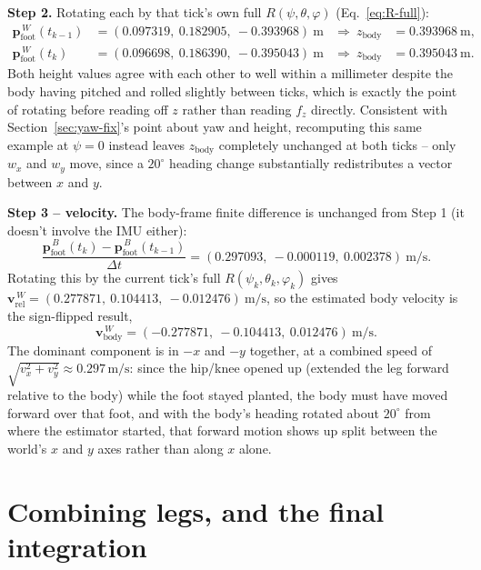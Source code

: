 \documentclass[11pt]{article}
\begin{document}
\noindent \textbf{Step 2.} Rotating each by that tick's own full
$R(\psi,\theta,\varphi)$ (Eq.~\eqref{eq:R-full}):
\begin{align}
\mathbf{p}_{\text{foot}}^{\,W}(t_{k-1}) &= (0.097319,\ 0.182905,\ -0.393968)\ \text{m}
&\Rightarrow\ z_{\text{body}} &= 0.393968\ \text{m}, \\
\mathbf{p}_{\text{foot}}^{\,W}(t_{k})   &= (0.096698,\ 0.186390,\ -0.395043)\ \text{m}
&\Rightarrow\ z_{\text{body}} &= 0.395043\ \text{m}.
\end{align}
Both height values agree with each other to well within a millimeter
despite the body having pitched and rolled slightly between ticks, which is
exactly the point of rotating before reading off $z$ rather than reading
$f_z$ directly. Consistent with Section~\ref{sec:yaw-fix}'s point about
yaw and height, recomputing this same example at $\psi = 0$ instead leaves
$z_{\text{body}}$ completely unchanged at both ticks -- only $w_x$ and
$w_y$ move, since a $20^\circ$ heading change substantially redistributes a
vector between $x$ and $y$.

\noindent \textbf{Step 3 -- velocity.} The body-frame finite difference is
unchanged from Step 1 (it doesn't involve the IMU either):
\begin{equation}
\frac{\mathbf{p}_{\text{foot}}^{\,B}(t_k) - \mathbf{p}_{\text{foot}}^{\,B}(t_{k-1})}{\Delta t}
= (0.297093,\ -0.000119,\ 0.002378)\ \text{m/s}.
\end{equation}
Rotating this by the current tick's full $R(\psi_k,\theta_k, \varphi_k)$ gives
$\mathbf{v}_{\text{rel}}^{\,W} = (0.277871,\ 0.104413,\ -0.012476)\ \text{m/s}$,
so the estimated body velocity is the sign-flipped result,
\begin{equation}
\mathbf{v}_{\text{body}}^{\,W} = (-0.277871,\ -0.104413,\ 0.012476)\ \text{m/s}.
\end{equation}
The dominant component is in $-x$ and $-y$ together, at a combined speed
of $\sqrt{v_x^2+v_y^2} \approx 0.297\,\text{m/s}$: since the hip/knee opened
up (extended the leg forward relative to the body) while the foot stayed
planted, the body must have moved forward over that foot, and with the
body's heading rotated about $20^\circ$ from where the estimator started,
that forward motion shows up split between the world's $x$ and $y$ axes
rather than along $x$ alone.

\section{Combining legs, and the final integration}
\end{document}
